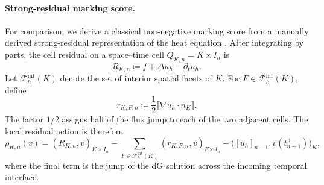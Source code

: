 \paragraph{Strong-residual marking score.}
For comparison, we derive a classical non-negative marking score from a manually derived strong-residual representation of the heat equation \cite{Bangerth_Rannacher_2003,Becker_Rannacher_2001}. After integrating by parts, the cell residual on a space--time cell \(Q_{K,n}=K\times I_n\) is
\begin{equation}
  R_{K,n}
  \coloneqq
  f+\Delta u_h-\partial_t u_h.
  \label{eq:mh-strong-cell-residual}
\end{equation}
Let \(\mathcal F_h^{\mathrm{int}}(K)\) denote the set of interior spatial facets of \(K\). For \(F\in\mathcal F_h^{\mathrm{int}}(K)\), define
\begin{equation}
  r_{K,F,n}
  \coloneqq
  \frac12
  \llbracket \nabla u_h\cdot n_K \rrbracket.
  \label{eq:mh-strong-facet-residual}
\end{equation}
The factor \(1/2\) assigns half of the flux jump to each of the two adjacent cells. The local residual action is therefore
\begin{equation}
  \rho_{K,n}(v)
  =
  (R_{K,n},v)_{K\times I_n}
  -
  \sum_{F\in\mathcal F_h^{\mathrm{int}}(K)}
  (r_{K,F,n},v)_{F\times I_n}
  -
  \bigl([u_h]_{n-1},v(t_{n-1}^{+})\bigr)_K,
\label{eq:mh-strong-residual-action}
\end{equation}
where the final term is the jump of the dG solution across the incoming temporal interface. 

